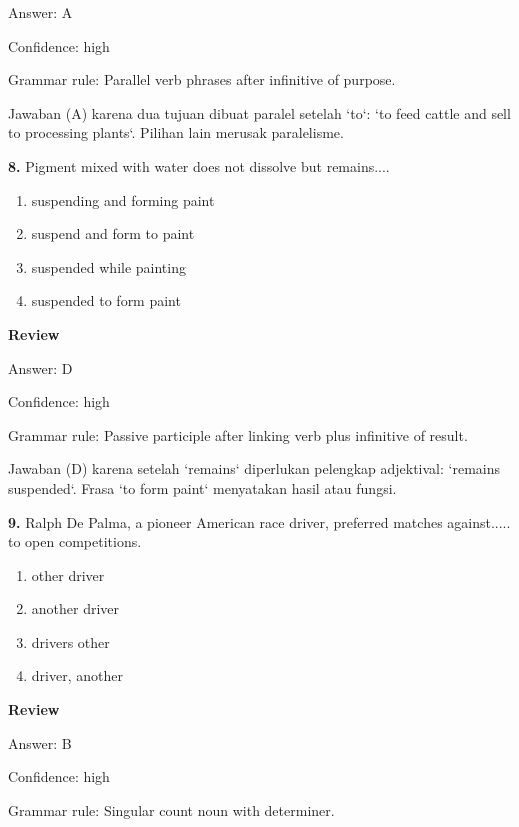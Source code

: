\documentclass[12pt]{article}
\begin{document}
Answer: A\par
Confidence: high\par
Grammar rule: Parallel verb phrases after infinitive of purpose.\par
Jawaban (A) karena dua tujuan dibuat paralel setelah `to`: `to feed cattle and sell to processing plants`. Pilihan lain merusak paralelisme.\par
\endgroup
\par
\vspace{0.25\baselineskip}
\noindent\textbf{8.} Pigment mixed with water does not dissolve but remains....
\begin{enumerate}[label=(\Alph*),leftmargin=*,itemsep=0.2em]
\item suspending and forming paint
\item suspend and form to paint
\item suspended while painting
\item suspended to form paint
\end{enumerate}
\par
\begingroup
\setlength{\parskip}{0pt}
\setlength{\parindent}{0pt}
\textbf{Review}\par
Answer: D\par
Confidence: high\par
Grammar rule: Passive participle after linking verb plus infinitive of result.\par
Jawaban (D) karena setelah `remains` diperlukan pelengkap adjektival: `remains suspended`. Frasa `to form paint` menyatakan hasil atau fungsi.\par
\endgroup
\par
\vspace{0.25\baselineskip}
\noindent\textbf{9.} Ralph De Palma, a pioneer American race driver, preferred matches against..... to open competitions.
\begin{enumerate}[label=(\Alph*),leftmargin=*,itemsep=0.2em]
\item other driver
\item another driver
\item drivers other
\item driver, another
\end{enumerate}
\par
\begingroup
\setlength{\parskip}{0pt}
\setlength{\parindent}{0pt}
\textbf{Review}\par
Answer: B\par
Confidence: high\par
Grammar rule: Singular count noun with determiner.\par
\end{document}
